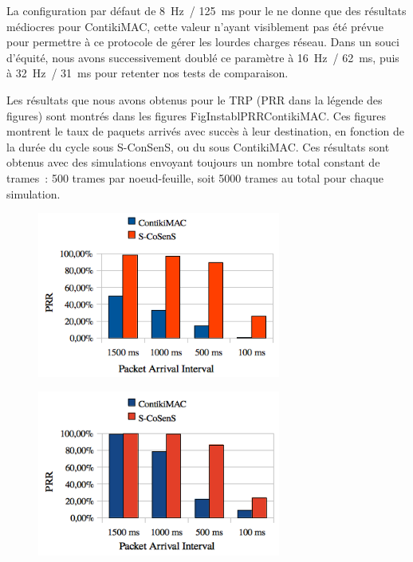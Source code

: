 La configuration par défaut de 8~Hz~/ 125~ms pour le  ne donne que des résultats médiocres pour ContikiMAC, cette valeur
n'ayant visiblement pas été prévue pour permettre à ce protocole de gérer
les lourdes charges réseau. Dans un souci d'équité, nous avons
successivement doublé ce paramètre à 16~Hz~/ 62~ms, puis à 32~Hz~/ 31~ms
pour retenter nos tests de comparaison.

\bigskip

Les résultats que nous avons obtenus pour le TRP (PRR dans la légende
des figures) sont montrés dans les figures 
{FigInstablPRRContikiMAC}. Ces figures montrent le taux de
paquets arrivés avec succès à leur destination, en fonction de la durée
du cycle sous S-ConSenS, ou du  sous ContikiMAC.
Ces résultats sont obtenus avec des simulations envoyant toujours
un nombre total constant de trames~: 500 trames par noeud-feuille,
soit 5000 trames au total pour chaque simulation.

\begin{figure}[htb]
\centering
\includegraphics[width=8cm]{images/ch5-trp-8hz.png}
\label{FigComparPRR8Hz}
\end{figure}

\begin{figure}[htb]
\centering
\includegraphics[width=8cm]{images/ch5-trp-16hz.png}
\label{FigComparPRR16Hz}
\end{figure}

